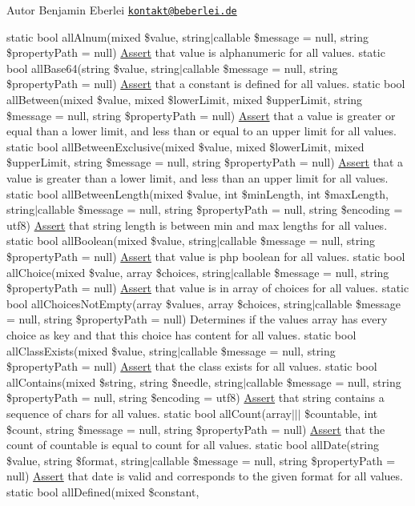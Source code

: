 \begin{DoxyAuthor}{Autor}
Benjamin Eberlei \href{mailto:kontakt@beberlei.de}{\tt kontakt@beberlei.\+de}
\end{DoxyAuthor}
static bool all\+Alnum(mixed \$value, string$\vert$callable \$message = null, string \$property\+Path = null) \mbox{\hyperlink{class_assert_1_1_assert}{Assert}} that value is alphanumeric for all values.  static bool all\+Base64(string \$value, string$\vert$callable \$message = null, string \$property\+Path = null) \mbox{\hyperlink{class_assert_1_1_assert}{Assert}} that a constant is defined for all values.  static bool all\+Between(mixed \$value, mixed \$lower\+Limit, mixed \$upper\+Limit, string \$message = null, string \$property\+Path = null) \mbox{\hyperlink{class_assert_1_1_assert}{Assert}} that a value is greater or equal than a lower limit, and less than or equal to an upper limit for all values.  static bool all\+Between\+Exclusive(mixed \$value, mixed \$lower\+Limit, mixed \$upper\+Limit, string \$message = null, string \$property\+Path = null) \mbox{\hyperlink{class_assert_1_1_assert}{Assert}} that a value is greater than a lower limit, and less than an upper limit for all values.  static bool all\+Between\+Length(mixed \$value, int \$min\+Length, int \$max\+Length, string$\vert$callable \$message = null, string \$property\+Path = null, string \$encoding = \textquotesingle{}utf8\textquotesingle{}) \mbox{\hyperlink{class_assert_1_1_assert}{Assert}} that string length is between min and max lengths for all values.  static bool all\+Boolean(mixed \$value, string$\vert$callable \$message = null, string \$property\+Path = null) \mbox{\hyperlink{class_assert_1_1_assert}{Assert}} that value is php boolean for all values.  static bool all\+Choice(mixed \$value, array \$choices, string$\vert$callable \$message = null, string \$property\+Path = null) \mbox{\hyperlink{class_assert_1_1_assert}{Assert}} that value is in array of choices for all values.  static bool all\+Choices\+Not\+Empty(array \$values, array \$choices, string$\vert$callable \$message = null, string \$property\+Path = null) Determines if the values array has every choice as key and that this choice has content for all values.  static bool all\+Class\+Exists(mixed \$value, string$\vert$callable \$message = null, string \$property\+Path = null) \mbox{\hyperlink{class_assert_1_1_assert}{Assert}} that the class exists for all values.  static bool all\+Contains(mixed \$string, string \$needle, string$\vert$callable \$message = null, string \$property\+Path = null, string \$encoding = \textquotesingle{}utf8\textquotesingle{}) \mbox{\hyperlink{class_assert_1_1_assert}{Assert}} that string contains a sequence of chars for all values.  static bool all\+Count(array$\vert$$\vert$$\vert$ \$countable, int \$count, string \$message = null, string \$property\+Path = null) \mbox{\hyperlink{class_assert_1_1_assert}{Assert}} that the count of countable is equal to count for all values.  static bool all\+Date(string \$value, string \$format, string$\vert$callable \$message = null, string \$property\+Path = null) \mbox{\hyperlink{class_assert_1_1_assert}{Assert}} that date is valid and corresponds to the given format for all values.  static bool all\+Defined(mixed \$constant, 